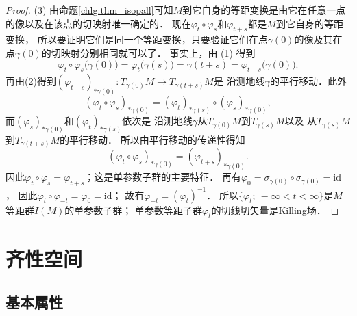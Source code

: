 \begin{proof}
(3) 由命题\ref{chlg:thm_isopall}可知$M$到它自身的等距变换是由它在任意一点的像以及在该点的切映射唯一确定的．
现在$\varphi_t \circ \varphi_s$和$\varphi_{t+s}$都是$M$到它自身的等距变换，
所以要证明它们是同一个等距变换，只要验证它们在点$\gamma(0)$的像及其在点$\gamma(0)$的切映射分别相同就可以了．
事实上，由 (1) 得到
\begin{equation}
    \varphi_t \circ \varphi_s\bigl(\gamma(0)\bigr)
    =\varphi_t\bigl(\gamma(s)\bigr)=\gamma(t+s)=\varphi_{t+s}\bigl(\gamma(0)\bigr) .
\end{equation}
再由(2)得到$(\varphi_{t+s})_{* \gamma(0)}: T_{\gamma(0)} M \to T_{\gamma(t+s)} M$是
沿测地线$\gamma$的平行移动．此外
\begin{equation}
    (\varphi_t \circ \varphi_s )_{* \gamma(0)}= (\varphi_t)_{* \gamma(s)} \circ(\varphi_s)_{* \gamma(0)},
\end{equation}
而$(\varphi_s)_{* \gamma(0)}$和$(\varphi_t)_{* \gamma(s)}$依次是
沿测地线$\gamma$从$T_{\gamma(0)} M$到$T_{\gamma(s)} M$以及
从$T_{\gamma(s)} M$到$T_{\gamma(t+s)} M$的平行移动．
所以由平行移动的传递性得知
\begin{equation}
    (\varphi_t \circ \varphi_s )_{* \gamma(0)}=  (\varphi_{t+s})_{* \gamma(0)} .
\end{equation}
因此$\varphi_t \circ \varphi_s=\varphi_{t+s} $；这是单参数子群的主要特征．
再有$\varphi_0=\sigma_{\gamma(0)} \circ \sigma_{\gamma(0)}=\mathrm{id}$，
因此$\varphi_t \circ \varphi_{-t}=\varphi_0=\mathrm{id}$；
故有$\varphi_{-t}=(\varphi_t)^{-1}$．
所以$\{\varphi_t ;\ -\infty<t<\infty \}$是$M$等距群$I(M)$的单参数子群；
单参数等距子群$\varphi_t$的切线切矢量是Killing场．
\end{proof}










\section{齐性空间}\label{chhss:sec_Homogeneous}


\subsection{基本属性}


